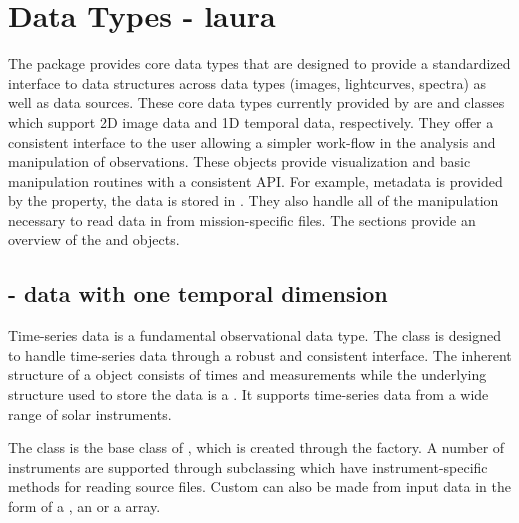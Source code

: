 \section{Data Types - laura}
\label{sec:data_types}
The \sunpypkg package provides core data types that are designed to provide a standardized interface to data structures across data types (images, lightcurves, spectra) as well as data sources. These core data types currently provided by \sunpypkg are \Map and \Timeseries classes which support 2D image data and 1D temporal data, respectively. They offer a consistent interface to the user allowing a simpler work-flow in the analysis and manipulation of observations. These objects provide visualization and basic manipulation routines with a consistent API. For example, metadata is provided by the  property, the data is stored in . They also handle all of the manipulation necessary to read data in from mission-specific files. The sections provide an overview of the \Timeseries and \Map objects. 

\subsection{\Timeseries - data with one temporal dimension}
\label{sec:timeseries}
Time-series data is a fundamental observational data type. The \Timeseries class is designed to handle time-series data through a robust and consistent interface. The inherent structure of a \Timeseries object consists of times and measurements while the underlying structure used to store the data is a . It supports time-series data from a wide range of solar instruments. 

The \GenericTimeSeries class is the base class of \Timeseries, which is created through the \Timeseries factory. A number of instruments are supported through subclassing which have instrument-specific methods for reading source files. Custom \Timeseries can also be made from input data in the form of a , an  or a  array. 

